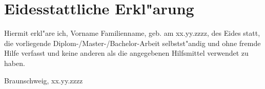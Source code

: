 \chapter*{Eidesstattliche Erkl"arung}\label{s:eid_erkl}


Hiermit erkl"are ich, Vorname Familienname, geb. am xx.yy.zzzz, des Eides
statt, die vorliegende Diplom-/Master-/Bachelor-Arbeit selbstst"andig und ohne
fremde Hilfe verfasst und keine anderen als die angegebenen Hilfsmittel verwendet zu
haben.

\vspace*{3cm}
Braunschweig, xx.yy.zzzz




